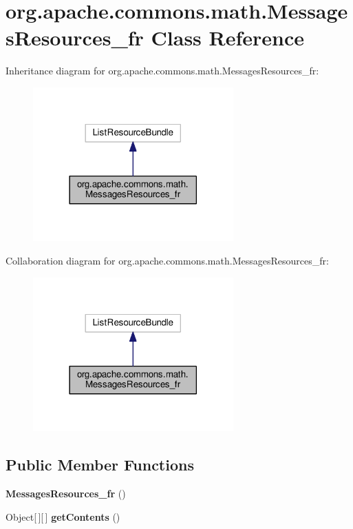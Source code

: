 \section{org.\-apache.\-commons.\-math.\-Messages\-Resources\-\_\-fr Class Reference}
\label{classorg_1_1apache_1_1commons_1_1math_1_1_messages_resources__fr}


Inheritance diagram for org.\-apache.\-commons.\-math.\-Messages\-Resources\-\_\-fr\-:
\nopagebreak
\begin{figure}[H]
\begin{center}
\leavevmode
\includegraphics[width=218pt]{classorg_1_1apache_1_1commons_1_1math_1_1_messages_resources__fr__inherit__graph}
\end{center}
\end{figure}


Collaboration diagram for org.\-apache.\-commons.\-math.\-Messages\-Resources\-\_\-fr\-:
\nopagebreak
\begin{figure}[H]
\begin{center}
\leavevmode
\includegraphics[width=218pt]{classorg_1_1apache_1_1commons_1_1math_1_1_messages_resources__fr__coll__graph}
\end{center}
\end{figure}
\subsection*{Public Member Functions}
\begin{DoxyCompactItemize}
\item 
{\bf Messages\-Resources\-\_\-fr} ()
\item 
Object[$\,$][$\,$] {\bf get\-Contents} ()
\end{DoxyCompactItemize}


